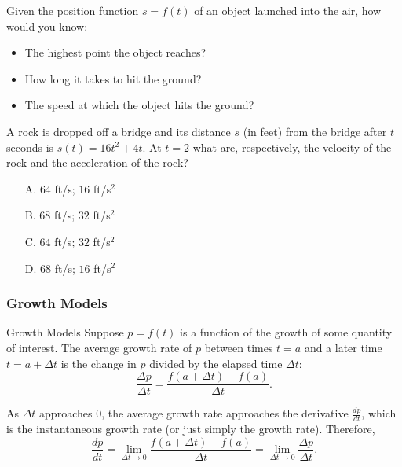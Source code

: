 \documentclass[cal1spr16Lectures.tex]{subfiles}
\begin{document}
\begin{frame}
\begin{que} Given the position function $s=f(t)$ of an object launched into the air, how would you know:
\begin{itemize}
	\item The highest point the object reaches?
	\item How long it takes to hit the ground?
	\item The speed at which the object hits the ground?
\end{itemize}
\end{que}
\end{frame}

\begin{frame}
\begin{exe}
A rock is dropped off a bridge and its distance $s$ (in feet) from the bridge after $t$ seconds is $s(t)=16t^2+4t$.  At $t=2$ what are, respectively, the velocity of the rock and the acceleration of the rock? 
\begin{itemize}
\item[A. ] $64$ ft/s; $16$ ft/s$^2$
\item[B. ] $68$ ft/s; $32$ ft/s$^2$
\item[C. ] $64$ ft/s; $32$ ft/s$^2$
\item[D. ] $68$ ft/s; $16$ ft/s$^2$
\end{itemize}
\end{exe}
\end{frame}

\subsubsection{Growth Models}

\begin{frame}{\small Growth Models}
Suppose $p=f(t)$ is a function of the growth of some quantity of interest.  The average growth rate of $p$ between times $t=a$ and a later time $t=a+\Delta t$ is the change in $p$ divided by the elapsed time $\Delta t$:
\[\frac{\Delta p}{\Delta t}=\frac{f(a+\Delta t)-f(a)}{\Delta t}.\]
\end{frame}

\begin{frame}{}
As $\Delta t$ approaches 0, the average growth rate approaches the derivative $\textstyle\frac{dp}{dt}$, which is the instantaneous growth rate (or just simply the growth rate).  Therefore,
\[\frac{dp}{dt}=\lim_{\Delta t \to 0} \frac{f(a+\Delta t)-f(a)}{\Delta t} = \lim_{\Delta t \to 0} \frac{\Delta p}{\Delta t}.\]
\end{frame}
\end{document}
